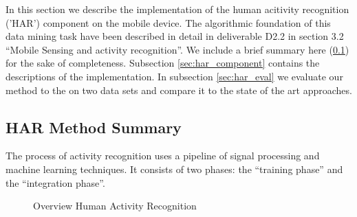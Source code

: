 \label{sec:HAR}

In this section we describe the implementation of the human acitivity
recognition ('HAR') component on the mobile device.  The algorithmic
foundation of this data mining task have been described in detail in
deliverable D2.2 in section 3.2 ``Mobile Sensing and activity
recognition''. We include a brief summary here (\ref{sec:har_method})
for the sake of completeness. Subsection \ref{sec:har_component}
contains the descriptions of the implementation. In subsection
\ref{sec:har_eval} we evaluate our method to the on two data sets and
compare it to the state of the art approaches.

\subsection{HAR Method Summary}\label{sec:har_method}

The process of activity recognition uses a pipeline of signal
processing and machine learning techniques. It consists of two phases:
the ``training phase'' and the ``integration phase''. 

\begin{figure}[htbp]
\centering
{}
\caption{Overview Human Activity Recognition}
\end{figure}


